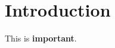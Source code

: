\documentclass{article}
\begin{document}
\section{Introduction}
This is \textbf{important}.
\end{document}
